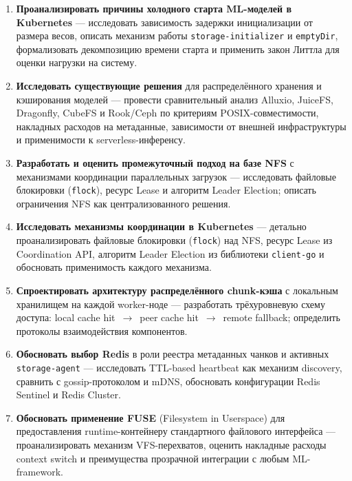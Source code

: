 \begin{enumerate}[leftmargin=*]
  \item \textbf{Проанализировать причины холодного старта ML-моделей в Kubernetes} --- исследовать зависимость задержки инициализации от размера весов, описать механизм работы \texttt{storage-initializer} и \texttt{emptyDir}, формализовать декомпозицию времени старта и применить закон Литтла для оценки нагрузки на систему.

  \item \textbf{Исследовать существующие решения} для распределённого хранения и кэширования моделей --- провести сравнительный анализ Alluxio, JuiceFS, Dragonfly, CubeFS и Rook/Ceph по критериям POSIX-совместимости, накладных расходов на метаданные, зависимости от внешней инфраструктуры и применимости к serverless-инференсу.

  \item \textbf{Разработать и оценить промежуточный подход на базе NFS} с механизмами координации параллельных загрузок --- исследовать файловые блокировки (\texttt{flock}), ресурс Lease и алгоритм Leader Election; описать ограничения NFS как централизованного решения.

  \item \textbf{Исследовать механизмы координации в Kubernetes} --- детально проанализировать файловые блокировки (\texttt{flock}) над NFS, ресурс Lease из Coordination API, алгоритм Leader Election из библиотеки \texttt{client-go} и обосновать применимость каждого механизма.

  \item \textbf{Спроектировать архитектуру распределённого chunk-кэша} с локальным хранилищем на каждой worker-ноде --- разработать трёхуровневую схему доступа: local cache hit~$\to$~peer cache hit~$\to$~remote fallback; определить протоколы взаимодействия компонентов.

  \item \textbf{Обосновать выбор Redis} в роли реестра метаданных чанков и активных \texttt{storage-agent} --- исследовать TTL-based heartbeat как механизм discovery, сравнить с gossip-протоколом и mDNS, обосновать конфигурации Redis Sentinel и Redis Cluster.

  \item \textbf{Обосновать применение FUSE} (Filesystem in Userspace) для предоставления runtime-контейнеру стандартного файлового интерфейса --- проанализировать механизм VFS-перехватов, оценить накладные расходы context switch и преимущества прозрачной интеграции с любым ML-framework.


\end{enumerate}
